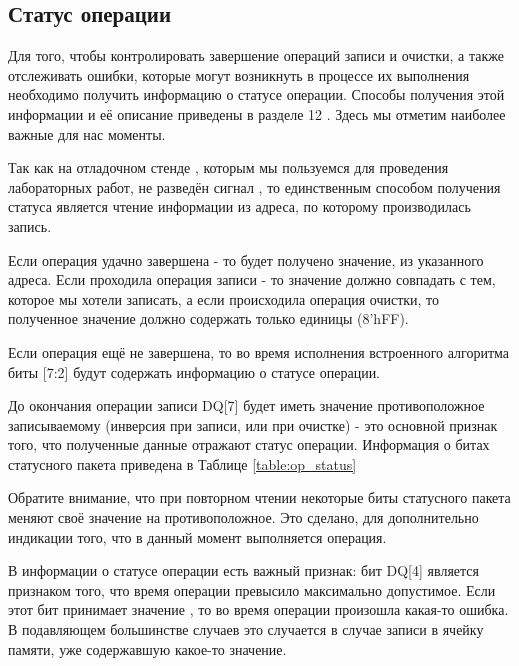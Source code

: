 \subsection{Статус операции}
\par{Для того, чтобы контролировать завершение операций записи и очистки, а также отслеживать ошибки, которые могут возникнуть в процессе их выполнения необходимо получить информацию о статусе операции. Способы получения этой информации и её описание приведены в разделе 12 . Здесь мы отметим наиболее важные для нас моменты.}
\par{Так как на отладочном стенде , которым мы пользуемся для проведения лабораторных работ, не разведён сигнал  , то единственным способом получения статуса является чтение информации из адреса, по которому производилась запись.}
\par{Если операция удачно завершена - то будет получено значение, из указанного адреса. Если проходила операция записи - то значение должно совпадать с тем, которое мы хотели записать, а если происходила операция очистки, то полученное значение должно содержать только единицы (8'hFF).}
\par{Если операция ещё не завершена, то во время исполнения встроенного алгоритма биты [7:2] будут содержать информацию о статусе операции.}
\par{До окончания операции записи DQ[7] будет иметь значение противоположное записываемому (инверсия при записи, или  при очистке) - это основной признак того, что полученные данные отражают статус операции. Информация о битах статусного пакета приведена в Таблице \ref{table:op_status}}
\par{Обратите внимание, что при повторном чтении некоторые биты статусного пакета меняют своё значение на противоположное. Это сделано, для дополнительно индикации того, что в данный момент выполняется операция.}
\par{В информации о статусе операции есть важный признак: бит DQ[4] является признаком того, что время операции превысило максимально допустимое. Если этот бит принимает значение , то во время операции произошла какая-то ошибка. В подавляющем большинстве случаев это случается в случае записи в ячейку памяти, уже содержавшую какое-то значение.}

